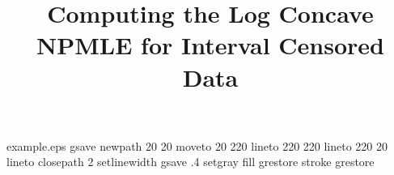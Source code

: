 %
%
%
%
%






\begin{filecontents*}{example.eps}
gsave
newpath
  20 20 moveto
  20 220 lineto
  220 220 lineto
  220 20 lineto
closepath
2 setlinewidth
gsave
  .4 setgray fill
grestore
stroke
grestore
\end{filecontents*}
%
\RequirePackage{fix-cm}
%
\documentclass[twocolumn]{svjour3}          %
%
\smartqed  %
%
\usepackage{graphicx}

\usepackage{amsmath} 
\usepackage{amssymb}


\usepackage{float}

\newtheorem{thm}{Theorem}


%
%
%
%
%


\title{Computing the Log Concave NPMLE for Interval Censored Data%
}

